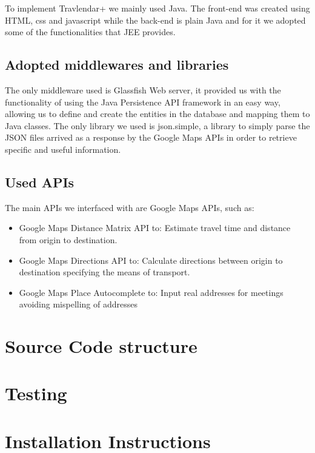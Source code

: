 \documentclass{article}
\begin{document}
To implement Travlendar+ we mainly used Java. The front-end was created using HTML, css and javascript while the back-end is plain Java and for it we adopted some of the functionalities that JEE provides.


\subsection{Adopted middlewares and libraries}
The only middleware used is Glassfish Web server, it provided us with the functionality of using the Java Persistence API framework in an easy way, allowing us to define and create the entities in the database and mapping them to Java classes.
The only library we used is json.simple, a library to simply parse the JSON files arrived as a response by the Google Maps APIs in order to retrieve specific and useful information.


\subsection{Used APIs}
The main APIs we interfaced with are Google Maps APIs, such as:
\begin{itemize}
\item Google Maps Distance Matrix API to:
Estimate travel time and distance from origin to destination.
\item Google Maps Directions API to:
Calculate directions between origin to destination specifying the means of transport.
\item Google Maps Place Autocomplete to: Input real addresses for meetings avoiding mispelling of addresses
\end{itemize}



\clearpage
\section{Source Code structure}

\clearpage
\section{Testing}

\clearpage
\section{Installation Instructions}

\end{document}
